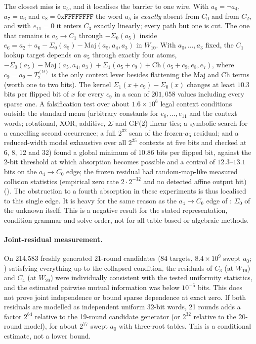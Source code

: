 \documentclass[11pt,a4paper]{article}
\newcommand{\Sig}[1]{\Sigma_{#1}}
\newcommand{\Maj}{\mathrm{Maj}}
\newcommand{\Ch}{\mathrm{Ch}}
\newcommand{\hex}[1]{\texttt{#1}}
\begin{document}
The closest miss is $a_5$, and it localises the barrier to one wire.  With
$a_6=\neg a_4$, $a_7=a_6$ and $e_8=\hex{0xFFFFFFFF}$ the word $a_5$ is
\emph{exactly} absent from $C_0$ and from $C_2$, and with $e_{11}=0$ it enters
$C_3$ exactly linearly; every path but one is cut.  The one that remains is
$a_5\to C_1$ through $-\Sig0(a_5)$ inside $e_6=a_2+a_6-\Sig0(a_5)-\Maj(a_5,a_4,a_3)$
in $W_{10}$.  With $a_0,\dots,a_3$ fixed, the $C_1$ lookup target depends on
$a_5$ through exactly four atoms,
$-\Sig0(a_5)-\Maj(a_5,a_4,a_3)+\Sig1(a_5+c_9)+\Ch(a_5+c_9,e_8,e_7)$, where
$c_9=a_9-T_2^{(9)}$ is the only context lever besides flattening the
$\Maj$ and $\Ch$ terms (worth one to two bits).  The kernel
$\Sig1(x+c_9)-\Sig0(x)$ changes at least $10.3$ bits per flipped bit of $x$
for every $c_9$ in a scan of $201{,}058$ values including every sparse one.
A falsification test over about $1.6\times10^{6}$ legal context conditions
outside the standard menu (arbitrary constants for $e_8,\dots,e_{11}$ and the
context words; rotational, XOR, additive, $\Sigma$ and GF(2)-linear ties;
a symbolic search for a cancelling second occurrence; a full $2^{32}$ scan of
the frozen-$a_5$ residual; and a reduced-width model exhaustive over all
$2^{25}$ contexts at five bits and checked at 6, 8, 12 and 32) found a global
minimum of $10.86$ bits per flipped bit, against the 2-bit threshold at which
absorption becomes possible and a control of $12.3$--$13.1$ bits on the
$a_4\to C_0$ edge; the frozen residual had random-map-like measured
collision statistics (empirical zero rate $2\cdot2^{-32}$ and no detected
affine output bit)
().  The obstruction to a fourth
absorption in these experiments is thus localised to this single edge.  It is
heavy for the same reason as the $a_4\to C_0$ edge of
\cite{Basra2026R20}: $\Sig0$ of the unknown itself.  This is a negative result
for the stated representation, condition grammar and solve order, not for all
table-based or algebraic methods.

\paragraph{Joint-residual measurement.}
On 214{,}583 freshly generated 21-round candidates (84 targets,
$8.4\times10^{9}$ swept $a_0$; )
satisfying everything up to the collapsed condition, the residuals of $C_3$ (at $W_{19}$) and $C_4$ (at
$W_{20}$) were individually consistent with the tested uniformity statistics,
and the estimated pairwise mutual information was below $10^{-5}$ bits.  This
does not prove joint independence or bound sparse dependence at exact zero.
If both residuals are modelled as independent uniform 32-bit words, 21 rounds
adds a factor $2^{64}$ relative to the 19-round candidate generator (or
$2^{32}$ relative to the 20-round model), for about $2^{77}$ swept $a_0$ with
three-root tables.  This is a conditional estimate, not a lower bound.
\end{document}
